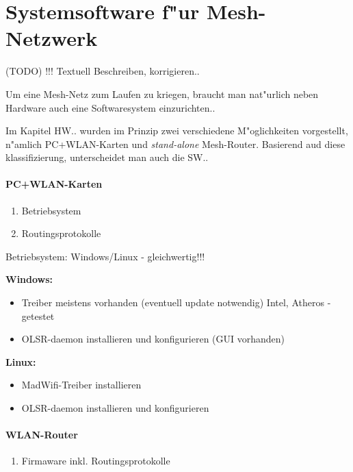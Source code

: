 \section{Systemsoftware f"ur Mesh-Netzwerk}

(TODO) !!! Textuell Beschreiben, korrigieren..

Um eine Mesh-Netz zum Laufen zu kriegen, braucht man 
nat"urlich neben Hardware auch eine Softwaresystem einzurichten..

Im Kapitel HW.. wurden im Prinzip zwei verschiedene M"oglichkeiten
vorgestellt, n"amlich PC+WLAN-Karten und \emph{stand-alone} Mesh-Router.
Basierend aud diese klassifizierung, unterscheidet man auch die SW..

\paragraph{PC+WLAN-Karten}

\begin{enumerate}
	\item Betriebsystem
	\item Routingsprotokolle
\end{enumerate}

Betriebsystem: Windows/Linux - gleichwertig!!!

\textbf{Windows:} 

\begin{itemize}	
	\item Treiber meistens vorhanden (eventuell update notwendig)
	Intel, Atheros - getestet

	\item OLSR-daemon installieren und konfigurieren (GUI vorhanden) 
\end{itemize}

\textbf{Linux: }

\begin{itemize}	
	\item MadWifi-Treiber installieren 
	\item OLSR-daemon installieren und konfigurieren
\end{itemize}

\paragraph{WLAN-Router}

\begin{enumerate}
	\item Firmaware inkl. Routingsprotokolle
\end{enumerate}

